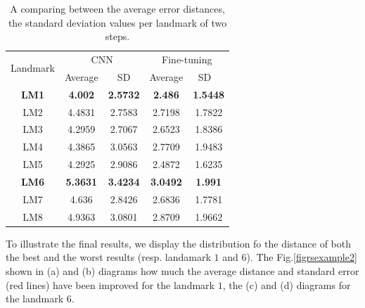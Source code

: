 \documentclass[10pt]{article}
\begin{document}
\begin{table}[htbp]
\centering
\begin{tabular}{ | c | c | c | c | c | }
\hline
	\multicolumn{1}{|c|}{\multirow{2}{*}{Landmark}} & \multicolumn{2}{c|}{CNN} &  \multicolumn{2}{c|}{Fine-tuning}  \\ \cline{2-5}
	 & Average & SD & Average & SD \  \\ \hline
	\textbf{LM1} & \textbf{4.002} & \textbf{2.5732} & \textbf{2.486} & \textbf{1.5448} \\ \hline
	LM2 & 4.4831 & 2.7583 & 2.7198 & 1.7822 \\ \hline
	LM3 & 4.2959 & 2.7067 & 2.6523 & 1.8386 \\ \hline
	LM4 & 4.3865 & 3.0563 & 2.7709 & 1.9483 \\ \hline
	LM5 & 4.2925 & 2.9086 & 2.4872 & 1.6235 \\ \hline
	\textbf{LM6} & \textbf{5.3631} & \textbf{3.4234} & \textbf{3.0492} & \textbf{1.991} \\ \hline
	LM7 & 4.636 & 2.8426 & 2.6836 & 1.7781 \\ \hline
	LM8 & 4.9363 & 3.0801 & 2.8709 & 1.9662 \\ \hline
\end{tabular}
\caption{A comparing between the average error distances, the standard deviation values per landmark of two steps.}
\label{tab2}
\end{table}
To illustrate the final results, we display the distribution fo the
distance of both the best and the worst results (resp. landamark $1$
and $6$). The Fig.\ref{figrsexample2} shown in (a) and (b) diagrams
 how much the average distance and standard error (red lines) have
 been improved for the landmark $1$, the (c) and (d) diagrams for the
 landmark $6$.
\end{document}

